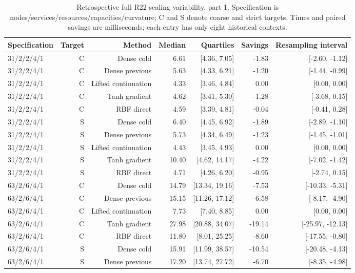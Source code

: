 \documentclass[11pt,letterpaper]{article}
\theoremstyle{definition}
\newcommand{\1}{\mathbf 1}
\begin{document}
\begin{table}[tbp]\centering\scriptsize
\caption{Retrospective full R22 scaling variability, part 1. Specification is nodes/services/resources/capacities/curvature; C and S denote coarse and strict targets. Times and paired savings are milliseconds; each entry has only eight historical contexts.}
\label{tab:r24-old-scaling-1}
\begin{tabular}{lrrrrrr}
\toprule
Specification & Target & Method & Median & Quartiles & Savings & Resampling interval\\
\midrule
31/2/2/4/1 & C & Dense cold & 6.61 & [4.36, 7.05] & -1.83 & [-2.60, -1.12]\\
31/2/2/4/1 & C & Dense previous & 5.63 & [4.33, 6.21] & -1.20 & [-1.44, -0.99]\\
31/2/2/4/1 & C & Lifted continuation & 4.33 & [3.46, 4.84] & 0.00 & [0.00, 0.00]\\
31/2/2/4/1 & C & Tanh gradient & 4.62 & [3.41, 5.30] & -1.28 & [-3.68, 0.15]\\
31/2/2/4/1 & C & RBF direct & 4.59 & [3.39, 4.81] & -0.04 & [-0.41, 0.28]\\
31/2/2/4/1 & S & Dense cold & 6.40 & [4.45, 6.92] & -1.89 & [-2.89, -1.10]\\
31/2/2/4/1 & S & Dense previous & 5.73 & [4.34, 6.49] & -1.23 & [-1.45, -1.01]\\
31/2/2/4/1 & S & Lifted continuation & 4.43 & [3.45, 4.93] & 0.00 & [0.00, 0.00]\\
31/2/2/4/1 & S & Tanh gradient & 10.40 & [4.62, 14.17] & -4.22 & [-7.02, -1.42]\\
31/2/2/4/1 & S & RBF direct & 4.71 & [4.26, 6.20] & -0.95 & [-2.74, 0.15]\\
63/2/6/4/1 & C & Dense cold & 14.79 & [13.34, 19.16] & -7.53 & [-10.33, -5.31]\\
63/2/6/4/1 & C & Dense previous & 15.15 & [11.26, 17.12] & -6.58 & [-8.17, -4.90]\\
63/2/6/4/1 & C & Lifted continuation & 7.73 & [7.40, 8.85] & 0.00 & [0.00, 0.00]\\
63/2/6/4/1 & C & Tanh gradient & 27.98 & [20.88, 34.07] & -19.14 & [-25.97, -12.13]\\
63/2/6/4/1 & C & RBF direct & 11.80 & [8.01, 25.25] & -8.60 & [-17.55, -0.80]\\
63/2/6/4/1 & S & Dense cold & 15.91 & [11.99, 38.57] & -10.54 & [-20.48, -4.13]\\
63/2/6/4/1 & S & Dense previous & 17.20 & [13.74, 27.72] & -6.70 & [-8.35, -4.98]\\

\end{tabular}
\end{table}
\end{document}
